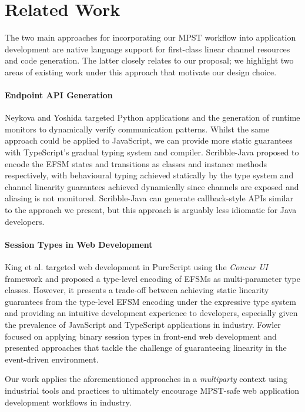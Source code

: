 \section{Related Work}
The two main approaches for incorporating our MPST workflow into application
development are native language support for first-class linear channel resources \cite{ATS} and code generation.
The latter closely relates to our proposal;
we highlight two areas of existing work under this approach that motivate our
design choice.

\paragraph{Endpoint API Generation}
Neykova and Yoshida targeted Python applications and the generation of runtime
monitors \cite{Python2017} to dynamically verify communication patterns.
Whilst the same approach could be applied to JavaScript, we can provide more
static guarantees with TypeScript's gradual typing system and compiler. Scribble-Java \cite{Hybrid2016} proposed to encode the EFSM
states and transitions as classes and instance methods respectively, with
behavioural typing achieved statically by the type system and channel linearity
guarantees achieved dynamically since channels are exposed and
aliasing is not monitored.
Scribble-Java can generate callback-style APIs similar to the approach we 
present, but this approach is arguably less idiomatic for Java developers.

\paragraph{Session Types in Web Development}
King et al. \cite{PureScript2019} targeted web development in PureScript using the
\textit{Concur UI} framework and proposed a type-level encoding of EFSMs as
multi-parameter type classes.
However, it presents a trade-off between achieving static linearity guarantees
from the type-level EFSM encoding under the expressive type system and
providing an intuitive development experience to developers, especially given
the prevalence of JavaScript and TypeScript applications in industry. Fowler \cite{MVU2019} focused on applying binary session types in front-end web
development and presented approaches that tackle the challenge of guaranteeing
linearity in the event-driven environment.

Our work applies the aforementioned approaches in a \textit{multiparty} context
using industrial tools and practices to ultimately encourage MPST-safe web
application development workflows in industry.


